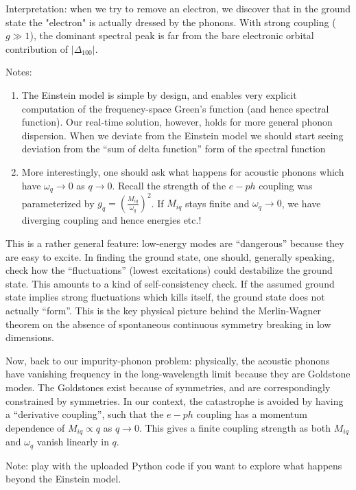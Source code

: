 Interpretation: when we try to remove an electron, we discover that in the ground state the "electron" is actually dressed by the phonons. With strong coupling ($g\gg 1$), the dominant spectral peak is far from the bare electronic orbital contribution of $|\Delta_{100}|$.

Notes:
\begin{enumerate}
    \item The Einstein model is simple by design, and enables very explicit computation of the frequency-space Green's function (and hence spectral function). Our real-time solution, however, holds for more general phonon dispersion. When we deviate from the Einstein model we should start seeing deviation from the ``sum of delta function'' form of the spectral function
    \item More interestingly, one should ask what happens for acoustic phonons which have $\omega_q\to 0$ as $q\to 0$. Recall the strength of the $e-ph$ coupling was parameterized by $g_q=\left(\frac{M_{iq}}{\omega_q}\right)^2$. If $M_{iq}$ stays finite and $\omega_q\to 0$, we have diverging coupling and hence energies etc.!
\end{enumerate}

This is a rather general feature: low-energy modes are ``dangerous'' because they are easy to excite. In finding the ground state, one should, generally speaking, check how the ``fluctuations'' (lowest excitations) could destabilize the ground state. This amounts to a kind of self-consistency check. If the assumed ground state implies strong fluctuations which kills itself, the ground state does not actually ``form''. This is the key physical picture behind the Merlin-Wagner theorem on the absence of spontaneous continuous symmetry breaking in low dimensions.

Now, back to our impurity-phonon problem: physically, the acoustic phonons have vanishing frequency in the long-wavelength limit because they are Goldstone modes. The Goldstones exist because of symmetries, and are correspondingly constrained by symmetries. In our context, the catastrophe is avoided by having a ``derivative coupling'', such that the $e-ph$ coupling has a momentum dependence of $M_{iq}\propto q$ as $q\to 0$. This gives a finite coupling strength as both $M_{iq}$ and $\omega_q$ vanish linearly in $q$.

Note: play with the uploaded Python code if you want to explore what happens beyond the Einstein model.
